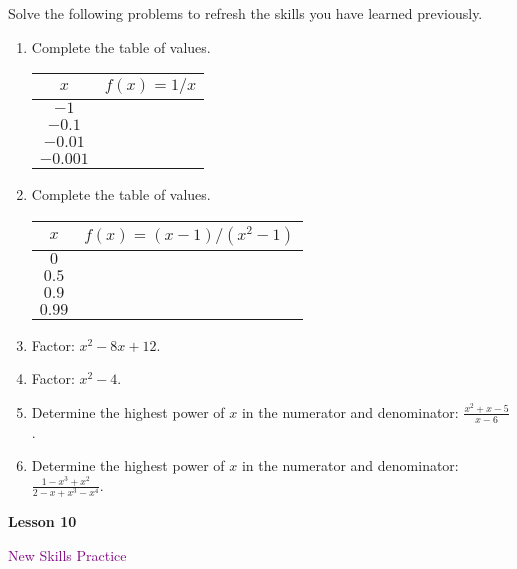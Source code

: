 \documentclass[10pt]{book}
\theoremstyle{definition}
\theoremstyle{remark}
\begin{document}
\begin{large}
\noindent
Solve the following problems to refresh the skills you have learned previously.
\begin{enumerate}
\item Complete the table of values.
\begin{tabular}{c|c}
$x$ & $\displaystyle f(x)=1/x$\\
\hline
$-1$ & \\
$-0.1$ & \\
$-0.01$ & \\
$-0.001$ & \\
\end{tabular}\vfil \vfil \vfil
\item Complete the table of values.
\begin{tabular}{c|c}
$x$ & $\displaystyle f(x)=(x-1)/(x^{2}-1)$\\
\hline
$0$ & \\
$0.5$ & \\
$0.9$ & \\
$0.99$ & \\
\end{tabular}\vfil \vfil \vfil
\item Factor: $x^{2} - 8x + 12$.\vfil \vfil\vfil
\item Factor: $x^{2} - 4$.\vfil \vfil\vfil
\item Determine the highest power of $x$ in the numerator and denominator: $\displaystyle \frac{x^{2}+x-5}{x-6}$.\vfil \vfil \vfil
\item Determine the highest power of $x$ in the numerator and denominator: $\displaystyle \frac{1-x^{3}+x^{2}}{2-x+x^{3}-x^{4}}$.\vfil \vfil \vfil
\end{enumerate}
\end{large}
\newpage


\begin{tcolorbox}[
  width=\textwidth,
  colback=gray!10, %
  colframe=white, %
  boxrule=0pt,    %
  left=1cm,       %
  right=1cm,      %
  sharp corners  %
]

\begin{minipage}[t]{0.5\textwidth}
  \Huge \textbf{Lesson 10}
\end{minipage}%
\hfill
\begin{minipage}[t]{0.5\textwidth}
  \Huge\textcolor{purple}{New Skills Practice}
\end{minipage}
\end{tcolorbox}
\end{document}
